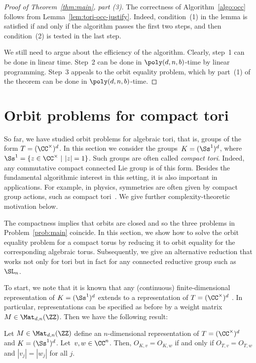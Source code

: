 \begin{proof} [Proof of Theorem~\ref{thm:main}, part (3)]
The correctness of Algorithm~\ref{algo:occ}  follows from Lemma~\ref{lem:tori-occ-justify}.
Indeed, condition~(1) in the lemma is satisfied if and only if the algorithm passes the first two steps, and then condition~(2) is tested in the last step.

We still need to argue about the efficiency of the algorithm.
Clearly, step~1 can be done in linear time. 
Step~2 can be done in $\poly(d,n,b)$-time by linear programming.
Step~3 appeals to the orbit equality problem, which by part~(1) of the theorem can be done in $\poly(d,n,b)$-time.
\end{proof}


%
\section{Orbit problems for compact tori}\label{sec:compact}
%
So far, we have studied orbit problems for algebraic tori, that is, groups of the form $T = (\CC^\times)^d$.
In this section we consider the groups~$K = (\Ss^1)^d$, where $\Ss^1 = \{z \in \CC^\times \ | \ |z| = 1\}$.
Such groups are often called \emph{compact tori}.
Indeed, any commutative compact connected Lie group is of this form.
Besides the fundamental algorithmic interest in this setting, it is also important in applications.
For example, in physics, symmetries are often given by compact group actions, such as compact tori~\cite{guillemin1990symplectic,audin2012torus}.
We give further complexity-theoretic motivation below.

The compactness implies that orbits are closed and so the three problems in Problem~\ref{prob:main} coincide.
In this section, we show how to solve the orbit equality problem for a compact torus by reducing it to orbit equality for the corresponding algebraic torus.
Subsequently, we give an alternative reduction that works not only for tori but in fact for any connected reductive group such as~$\SL_n$.

To start, we note that it is known that any (continuous) finite-dimensional representation of $K = (\Ss^1)^d$
extends to a representation of $T = (\CC^\times)^d$ \cite{weyl:39}.
%
In particular, representations can be specified as before by a weight matrix $M \in\Mat_{d,n}(\ZZ)$.
Then we have the following result:

\begin{proposition}
Let $M \in\Mat_{d,n}(\ZZ)$ define an $n$-dimensional representation of $T = (\CC^\times)^d$ and $K = (\Ss^1)^d$. Let~$v,w \in \CC^n$.
Then, $O_{K,v} = O_{K,w}$ if and only if $O_{T,v} = O_{T,w}$ and $|v_j| = |w_j|$ for all $j$.
\end{proposition}

